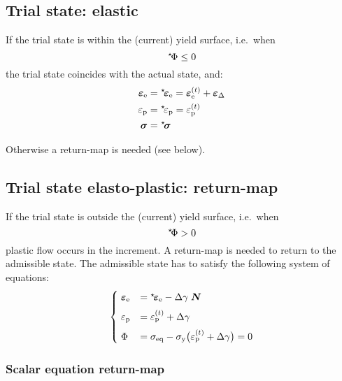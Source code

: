 \documentclass[namecite, fleqn]{goose-article}
\newcommand\leftstar[1]{\hspace*{-.3em}~^\star\!#1}
\begin{document}
\subsection{Trial state: elastic}

If the trial state is within the (current) yield surface, i.e.\ when
\begin{equation}
    \leftstar{\Phi} \leq 0
\end{equation}
the trial state coincides with the actual state, and:
\begin{align}
    \bm{\varepsilon}_\mathrm{e}
    &= \leftstar{\bm{\varepsilon}}_\mathrm{e}
    = \bm{\varepsilon}_\mathrm{e}^{(t)} + \bm{\varepsilon}_\Delta
    \\
    \varepsilon_\mathrm{p}
    &= \leftstar{\varepsilon}_\mathrm{p}
    = \varepsilon_\mathrm{p}^{(t)}
    \\
    \bm{\sigma}
    &= \leftstar{\bm{\sigma}}
\end{align}

Otherwise a return-map is needed (see below).

\subsection{Trial state elasto-plastic: return-map}

If the trial state is outside the (current) yield surface, i.e.\ when
\begin{equation}
    \leftstar{\Phi} > 0
\end{equation}
plastic flow occurs in the increment.
A return-map is needed to return to the admissible state.
The admissible state has to satisfy the following system of equations:
\begin{equation}
    \begin{cases}
        \; \bm{\varepsilon}_\mathrm{e}
        &= \leftstar\bm{\varepsilon}_\mathrm{e}
        - \Delta \gamma \; \bm{N}
        \\[2mm]
        \; \varepsilon_\mathrm{p}
        &= \varepsilon_\mathrm{p}^{(t)} + \Delta \gamma
        \\[2mm]
        \; \Phi
        &= \sigma_\mathrm{eq}
        - \sigma_\mathrm{y} \big( \varepsilon_\mathrm{p}^{(t)} + \Delta\gamma \big)
        = 0
    \end{cases}
\end{equation}

\subsubsection{Scalar equation return-map}
\end{document}
